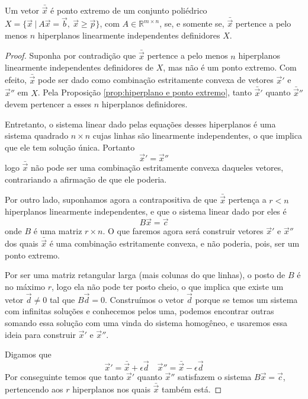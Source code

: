 \begin{thm:ponto extremo}
	\label{thm:ponto extremo}
	Um vetor $\bar{\vec{x}}$ é ponto extremo de um conjunto poliédrico
	$X = \{\vec{x}\ |\ A\vec{x} = \vec{b},\ \vec{x} \geq \vec{p}\}$, com
	$A \in \mathbb{R}^{m \times n}$, se, e somente se, $\bar{\vec{x}}$ pertence
	a pelo menos $n$ hiperplanos linearmente independentes definidores $X$.

	\begin{proof}
		Suponha por contradição que $\bar{\vec{x}}$ pertence a pelo menos $n$
		hiperplanos linearmente independentes definidores de $X$, mas não é um
		ponto extremo. Com efeito, $\bar{\vec{x}}$ pode ser dado como combinação
		estritamente convexa de vetores $\vec{x}'$ e $\vec{x}''$ em $X$.
		Pela Proposição \ref{prop:hiperplano e ponto extremo}, tanto
		$\bar{\vec{x}}'$ quanto $\bar{\vec{x}}''$ devem pertencer a esses $n$
		hiperplanos definidores.

		Entretanto, o sistema linear dado pelas equações desses hiperplanos é uma
		sistema quadrado $n \times n$ cujas linhas são linearmente independentes,
		o que implica que ele tem solução única. Portanto
		\[\vec{x}' = \vec{x}''\]logo $\bar{\vec{x}}$ não pode ser uma combinação
		estritamente convexa daqueles vetores, contrariando a afirmação de que
		ele poderia.

		Por outro lado, suponhamos agora a contrapositiva de que $\bar{\vec{x}}$
		pertença a $r < n$ hiperplanos linearmente independentes, e que o sistema
		linear dado por eles é \[B\vec{x} = \vec{c}\]onde $B$ é uma matriz
		$r \times n$. O que faremos agora será construir vetores $\vec{x}'$ e
		$\vec{x}''$ dos quais $\bar{\vec{x}}$ é uma combinação estritamente
		convexa, e não poderia, pois, ser um ponto extremo.

		Por ser uma matriz retangular larga (mais colunas do que linhas), o
		posto de $B$ é no máximo $r$, logo ela não pode ter posto cheio, o que
		implica que existe um vetor $\vec{d} \neq 0$ tal que $B \vec{d} = 0$.
		Construímos o vetor $\vec{d}$ porque se temos um sistema com infinitas
		soluções e conhecemos pelos uma, podemos encontrar outras somando essa
		solução com uma vinda do sistema homogêneo, e usaremos essa ideia para
		construir $\vec{x}'$ e $\vec{x}''$.

		Digamos que
		\begin{equation*}
			\vec{x}' = \bar{\vec{x}} + \epsilon \vec{d}
			\quad
			\vec{x}'' = \bar{\vec{x}} - \epsilon \vec{d}
		\end{equation*}
		Por conseguinte temos que tanto $\vec{x}'$ quanto $\vec{x}''$ satisfazem o sistema
		$B\vec{x} = \vec{c}$, pertencendo aos $r$ hiperplanos nos quais
		$\bar{\vec{x}}$ também está.


\end{proof}
\end{thm:ponto extremo}
